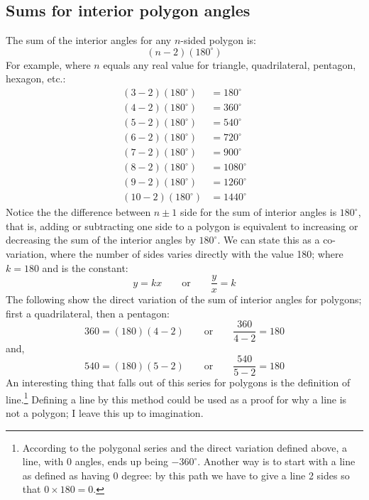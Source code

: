 \subsection{Sums for interior polygon angles}
The sum of the interior angles for any $n$-sided polygon is:
\begin{equation}
    (n - 2)(180^\circ) 
\end{equation}
For example, where $n$ equals any real value for triangle, quadrilateral, pentagon, hexagon, etc.:
\begin{equation}
 \begin{split}
(3-2)(180^\circ)& = 180^\circ\\
(4-2)(180^\circ)& = 360^\circ\\
(5-2)(180^\circ)& = 540^\circ\\
(6-2)(180^\circ)& = 720^\circ\\
(7-2)(180^\circ)& = 900^\circ\\
(8-2)(180^\circ)& = 1080^\circ\\
(9-2)(180^\circ)& = 1260^\circ\\
(10-2)(180^\circ)& = 1440^\circ
\end{split}   
\end{equation}
Notice the the difference between $n \pm1$ side for the sum of interior angles is $180^\circ$, that is, adding or subtracting one side to a polygon is equivalent to increasing or decreasing the sum of the interior angles by $180^\circ$. We can state this as a co-variation, where the number of sides varies directly with the value 180; where $k = 180$ and is the constant:
\begin{equation}
    y =kx \qquad \text{or} \qquad \frac{y}{x} =k
\end{equation}
The following show the direct variation of the sum of interior angles for polygons; first a quadrilateral, then a pentagon:
\begin{equation}
    360 =(180)(4-2) \qquad \text{or} \qquad \frac{360}{4-2} =180
\end{equation}
and,
\begin{equation}
    540 =(180)(5-2) \qquad  \text{or} \qquad \frac{540}{5-2} =180
\end{equation}
An interesting thing that falls out of this series for polygons is the definition of line.\footnote{According to the polygonal series and the direct variation defined above, a line, with 0 angles, ends up being $-360^\circ$. Another way is to start with a line as defined as having 0 degree: by this path we have to give a line 2 sides so that $0 \times 180 = 0$.} Defining a line by this method could be used as a proof for why a line is not a polygon; I leave this up to imagination.

